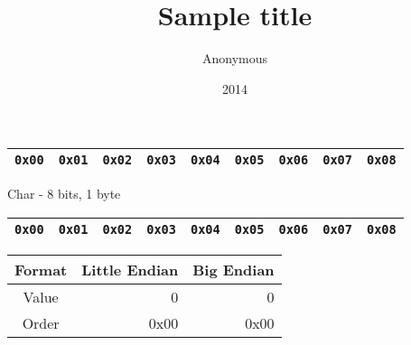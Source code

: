 \documentclass{beamer}
\title{Sample title}
\author{Anonymous}
\institute{Overleaf}
\date{2014}
\begin{document}

\begin{frame}
\begin{table}[]
\begin{tabular}{|l|l|l|l|l|l|l|l|l|}
\hline
 \texttt{0x00} & \texttt{0x01} & \texttt{0x02} & \texttt{0x03} & \texttt{0x04} & \texttt{0x05} & \texttt{0x06} & \texttt{0x07} &
 \texttt{0x08} \\
\hline 
\end{tabular}
\end{table}
\end{frame}

\begin{frame}{Char - 8 bits, 1 byte}

\begin{table}[]
\begin{tabular}{|l|l|l|l|l|l|l|l|l|}
\hline
 \color{red}\texttt{0x00} & \texttt{0x01} & \texttt{0x02} & \texttt{0x03} & \texttt{0x04} & \texttt{0x05} & \texttt{0x06} & \texttt{0x07} &
 \texttt{0x08} \\
\hline 
\end{tabular}
\end{table}

\begin{table}[]
\begin{tabular}{c r r}
Format & Little Endian & Big Endian \\
\hline
Value &  0   & 0 \\
Order & 0x00 & 0x00
\end{tabular}
\end{table}

\end{frame}
\end{document}
